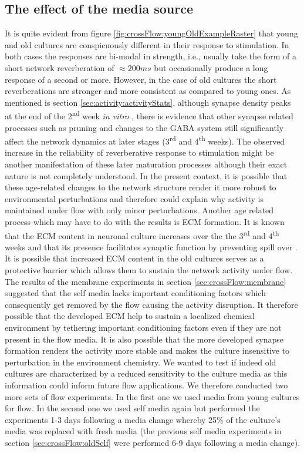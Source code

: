         \subsection{The effect of the media source}
        It is quite evident from figure \ref{fig:crossFlow:youngOldExampleRaster} that young and old cultures are conspicuously different in their response to stimulation. In both cases the responses are bi-modal in strength, i.e., usually take the form of a short network reverberation of \(\approx 200 ms\) but occasionally produce a long response of a second or more. However, in the case of old cultures the short reverberations are stronger and more consistent as compared to young ones. As mentioned is section \ref{sec:activity:activityStats}, although synapse density peaks at the end of the 2\textsuperscript{nd} week \textit{in vitro} \cite{li2003some}, there is evidence that other synapse related processes such as pruning and changes to the GABA system still significantly affect the network dynamics at later stages (3\textsuperscript{rd} and 4\textsuperscript{th} weeks). The observed increase in the reliability of reverberative response to stimulation might be another manifestation of these later maturation processes although their exact nature is not completely understood. In the present context, it is possible that these age-related changes to the network structure render it more robust to environmental perturbations and therefore could explain why activity is maintained under flow with only minor perturbations. Another age related process which may have to do with the results is ECM formation. It is known that the ECM content in neuronal culture increases over the the 3\textsuperscript{rd} and 4\textsuperscript{th} weeks and that its presence facilitates synaptic function by preventing spill over \cite{bikbaev2015brain}. It is possible  that increased ECM content in the old cultures serves as a protective barrier which allows them to sustain the network activity under flow. The results of the membrane experiments in section \ref{sec:crossFlow:membrane} suggested that the self media lacks important conditioning factors which consequently get removed by the flow causing the activity disruption. It therefore possible that the developed ECM help to sustain a localized chemical environment by tethering important conditioning factors even if they are not present in the flow media. It is also possible that the more developed synapse formation renders the activity more stable and makes the culture insensitive to perturbation in the environment chemistry. We wanted to test if indeed old cultures are characterized by a reduced sensitivity to the culture media as this information could inform future flow applications. We therefore conducted two more sets of flow experiments. In the first one we used media from young cultures for flow. In the second one we used self media again but performed the experiments 1-3 days following a media change whereby 25\% of the culture's media was replaced with fresh media (the previous self media experiments in section \ref{sec:crossFlow:oldSelf} were performed 6-9 days following a media change).

